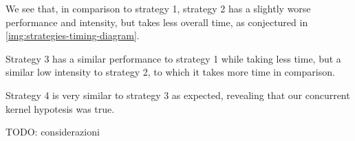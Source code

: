 We see that, in comparison to strategy 1, strategy 2 has a slightly worse performance and intensity, but takes less overall time, as conjectured in \ref{img:strategies-timing-diagram}.

Strategy 3 has a similar performance to strategy 1 while taking less time, but a similar low intensity to strategy 2, to which it takes more time in comparison.

Strategy 4 is very similar to strategy 3 as expected, revealing that our concurrent kernel hypotesis was true.

TODO: considerazioni
